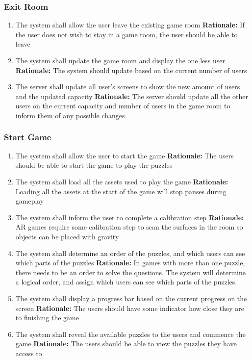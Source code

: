 \documentclass[12pt]{article}
\begin{document}
\subsubsection{Exit Room}
\begin{enumerate}[label=ER\arabic*., series=ExitRoom]
    \item The system shall allow the user leave the existing game room\newline 
    \textbf{Rationale:} If the user does not wish to stay in a game room, the user should be able to leave
    \item The system shall update the game room and display the one less user\newline 
    \textbf{Rationale:} The system should update based on the current number of users
    \item The server shall update all user's screens to show the new amount of users and the updated capacity\newline 
    \textbf{Rationale:} The server should update all the other users on the current capacity and number of users in the game room to inform them of any possible changes
\end{enumerate}


\subsubsection{Start Game}
\begin{enumerate}[label=ST\arabic*., series=StartGame]
	\item The system shall allow the user to start the game\newline 
    \textbf{Rationale:} The users should be able to start the game to play the puzzles
    \item The system shall load all the assets used to play the game\newline 
    \textbf{Rationale:} Loading all the assets at the start of the game will stop pauses during gameplay
    \item The system shall inform the user to complete a calibration step\newline 
    \textbf{Rationale:} AR games require some calibration step to scan the surfaces in the room so objects can be placed with gravity
    \item The system shall determine an order of the puzzles, and which users can see which parts of the puzzles\newline 
    \textbf{Rationale:} In games with more than one puzzle, there needs to be an order to solve the questions. The system will determine a logical order, and assign which users can see which parts of the puzzles.
    \item The system shall display a progress bar based on the current progress on the screen\newline 
    \textbf{Rationale:} The users should have some indicator how close they are to finishing the game
    \item The system shall reveal the available puzzles to the users and commence the game\newline 
    \textbf{Rationale:} The users should be able to view the puzzles they have access to
\end{enumerate}
\end{document}
